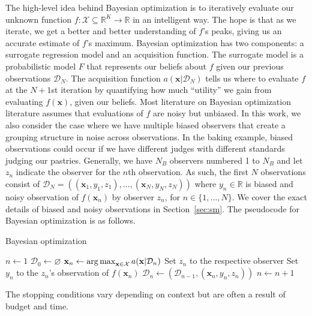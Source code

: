 The high-level idea behind Bayesian optimization is to iteratively evaluate our unknown
function $f: \mathcal{X} \subseteq \mathbb{R}^{K} \to \mathbb{R}$ in an intelligent way.
The hope is that as we iterate, we get a better and better understanding of $f$'s
peaks, giving us an accurate estimate of $f$'s maximum.
Bayesian optimization has two components: a surrogate regression model and an acquisition function.
The surrogate model is a probabilistic model $F$ that represents our beliefs about $f$ given our previous observations $\mathcal{D}_N$.
The acquisition function $a( \mathbf{x} | \mathcal{D}_N)$ tells us where to evaluate $f$ at the $N + 1$st iteration by
quantifying how much ``utility'' we gain from evaluating $f(\mathbf{x})$, given our beliefs.
Most literature on Bayesian optimization literature assumes that evaluations of $f$ are noisy but unbiased.
In this work, we also consider the case where we have multiple biased observers that create a grouping structure in noise across observations.
In the baking example, biased observations could occur if we have different judges with different standards judging our pastries.
Generally, we have $N_B$ observers numbered 1 to $N_B$ and let $z_n$ indicate the observer for the $n$th observation.
As such, the first $N$ observations consist of $\mathcal{D}_N = ((\mathbf{x}_1, y_1, z_1), \dots, (\mathbf{x}_N, y_N, z_N))$ where
$y_n \in \mathbb{R}$ is biased and noisy observation of $f(\mathbf{x}_n)$ by observer $z_n$, for $n \in \{ 1, \dots, N \}$.
We cover the exact details of biased and noisy observations in Section~\ref{sec:sm}.
The pseudocode for Bayesian optimization is as follows.
\begin{algorithm}
    \begin{algorithmic}[1]
        \caption{Bayesian optimization}
        \label{alg:bo}
        \State $n \gets 1$
        \State $\mathcal{D}_0 \gets \varnothing$
        \State $\mathbf{x}_n \gets \operatorname*{arg\,max}_{\mathbf{x} \in \mathcal{X}} a(\mathbf{x} | \mathcal{D}_n)$  
        \State Set $z_n$ to the respective observer
        \State Set $y_n$ to the $z_n$'s observation of $f(\mathbf{x}_n)$
        \State $\mathcal{D}_n \gets (\mathcal{D}_{n - 1}, (\mathbf{x}_n, y_n, z_n))$
        \State $n \gets n + 1$
        \EndWhile
    \end{algorithmic}
\end{algorithm}
The stopping conditions vary depending on context but are often a result of budget and time.

